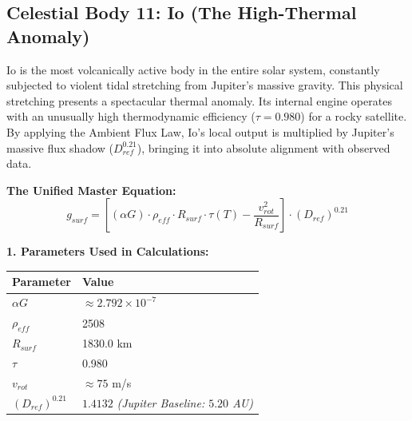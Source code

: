 \documentclass[11pt, a4paper]{article}
\begin{document}
\clearpage
\subsection{Celestial Body 11: Io (The High-Thermal Anomaly)}
  Io is the most volcanically active body in the entire solar system, constantly subjected to violent tidal stretching from Jupiter's massive gravity. This physical stretching presents a spectacular thermal anomaly. Its internal engine operates with an unusually high thermodynamic efficiency ($\tau = 0.980$) for a rocky satellite. By applying the Ambient Flux Law, Io's local output is multiplied by Jupiter's massive flux shadow ($D_{ref}^{0.21}$), bringing it into absolute alignment with observed data.

  \vspace{0.5em}
  \noindent \textbf{The Unified Master Equation:}
  $$ g_{surf} = \left[ (\alpha G) \cdot \rho_{eff} \cdot R_{surf} \cdot \tau(T) - \frac{v_{rot}^2}{R_{surf}} \right] \cdot (D_{ref})^{0.21} $$

  \vspace{0.5em}
  \noindent \textbf{1. Parameters Used in Calculations:} \\[0.5em]
  \begingroup
  \renewcommand{\arraystretch}{1.3}
  \hspace*{2em}
  \begin{tabular}{|l|l|}
    \hline
    \textbf{Parameter} & \textbf{Value} \\ \hline
    $\alpha G$ & $\approx 2.792 \times 10^{-7}$ \\ \hline
    $\rho_{eff}$ & 2508 \\ \hline
    $R_{surf}$ & 1830.0 km \\ \hline
    $\tau$ & 0.980 \\ \hline
    $v_{rot}$ & $\approx 75$ m/s \\ \hline
    $(D_{ref})^{0.21}$ & $1.4132$ \textit{(Jupiter Baseline: $5.20$ AU)} \\ \hline
  \end{tabular}
  \endgroup
\end{document}
